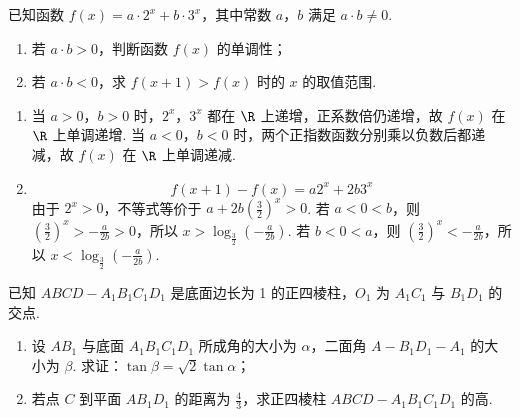 \begin{problem}
已知函数 \(f(x) = a \cdot 2^{x} + b \cdot 3^{x}\)，其中常数 \(a\)，\(b\) 满足 \(a \cdot b \neq 0\).

\begin{enumerate}
\item 若 \(a \cdot b > 0\)，判断函数 \(f(x)\) 的单调性；
\item 若 \(a \cdot b < 0\)，求 \(f(x+1) > f(x)\) 时的 \(x\) 的取值范围.
\end{enumerate}
\end{problem}

\begin{solution}
\begin{enumerate}
\item 当 \(a>0\)，\(b>0\) 时，\(2^x\)，\(3^x\) 都在 \(\R\) 上递增，正系数倍仍递增，故 \(f(x)\) 在 \(\R\) 上单调递增. 当 \(a<0\)，\(b<0\) 时，两个正指数函数分别乘以负数后都递减，故 \(f(x)\) 在 \(\R\) 上单调递减.
\item
\[
f(x+1)-f(x)=a2^x+2b3^x
\]
由于 \(2^x>0\)，不等式等价于 \(a+2b(\frac32)^x>0\). 若 \(a<0<b\)，则 \((\frac32)^x> -\frac{a}{2b}>0\)，所以 \(x>\log_{\frac32}\left(-\frac{a}{2b}\right)\). 若 \(b<0<a\)，则 \((\frac32)^x< -\frac{a}{2b}\)，所以 \(x<\log_{\frac32}\left(-\frac{a}{2b}\right)\).
\end{enumerate}
\end{solution}

\begin{problem}
已知 \(ABCD - A_{1}B_{1}C_{1}D_{1}\) 是底面边长为 1 的正四棱柱，\(O_1\) 为 \(A_1C_1\) 与 \(B_1D_1\) 的交点.

\begin{enumerate}
\item 设 \(AB_1\) 与底面 \(A_1B_1C_1D_1\) 所成角的大小为 \(\alpha\)，二面角 \(A - B_{1}D_{1} - A_1\) 的大小为 \(\beta\). 求证：\(\tan \beta = \sqrt{2}\tan \alpha\)；
\item 若点 \(C\) 到平面 \(AB_1D_1\) 的距离为 \(\frac{4}{3}\)，求正四棱柱 \(ABCD - A_{1}B_{1}C_{1}D_{1}\) 的高.
\end{enumerate}

\end{problem}

